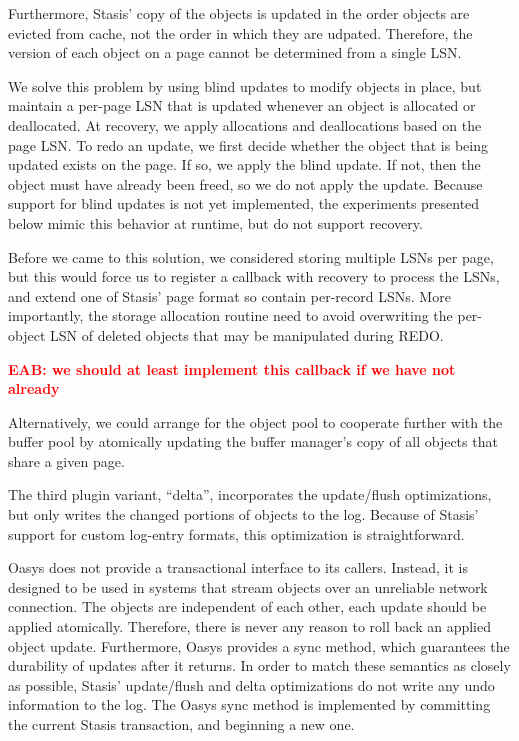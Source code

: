 \documentclass[letterpaper,twocolumn,10pt]{article}
\newcommand{\yad}{Stasis\xspace}
\newcommand{\yads}{Stasis'\xspace}
\newcommand{\oasys}{Oasys\xspace}
\newcommand{\eab}[1]{\textcolor{red}{\bf EAB: #1}}
\begin{document}
Furthermore, \yads copy of the objects is updated in the order objects
are evicted from cache, not the order in which they are udpated.
Therefore, the version of each object on a page cannot be determined
from a single LSN.

We solve this problem by using blind updates to modify
objects in place, but maintain a per-page LSN that is updated whenever
an object is allocated or deallocated.  At recovery, we apply
allocations and deallocations based on the page LSN.  To redo an
update, we first decide whether the object that is being updated
exists on the page.  If so, we apply the blind update.  If not, then
the object must have already been freed, so we do not apply the
update. Because support for blind updates is not yet implemented, the
experiments presented below mimic this behavior at runtime, but do not
support recovery.

Before we came to this solution, we considered storing multiple LSNs
per page, but this would force us to register a callback with recovery
to process the LSNs, and extend one of \yads page format so contain
per-record LSNs.  More importantly, the storage allocation routine need
to avoid overwriting the per-object LSN of deleted objects that may be
manipulated during REDO.

\eab{we should at least implement this callback if we have not already}

Alternatively, we could arrange for the object pool to cooperate 
further with the buffer pool by atomically updating the buffer 
manager's copy of all objects that share a given page.

The third plugin variant, ``delta'', incorporates the update/flush
optimizations, but only writes the changed portions of
objects to the log.  Because of \yads support for custom log-entry
formats, this optimization is straightforward.

\oasys does not provide a transactional interface to its callers.
Instead, it is designed to be used in systems that stream objects over
an unreliable network connection.  The objects are independent of each
other, each update should be applied atomically.  Therefore, there is
never any reason to roll back an applied object update.  Furthermore,
\oasys provides a sync method, which guarantees the durability of
updates after it returns.  In order to match these semantics as
closely as possible, \yads update/flush and delta optimizations do not
write any undo information to the log.  The \oasys sync method is
implemented by committing the current \yad transaction, and beginning
a new one.
\end{document}
